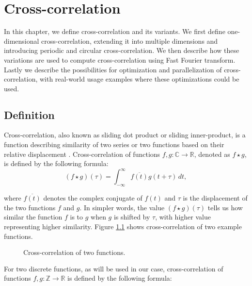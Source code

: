 
\chapter{Cross-correlation}
\label{sec:cross-corr}

In this chapter, we define cross-correlation and its variants. We first define one-dimensional cross-correlation, extending it into multiple dimensions and introducing periodic and circular cross-correlation. We then describe how these variations are used to compute cross-correlation using Fast Fourier transform. Lastly we describe the possibilities for optimization and parallelization of cross-correlation, with real-world usage examples where these optimizations could be used.


\section{Definition}

Cross-correlation, also known as sliding dot product or sliding inner-product, is a function describing similarity of two series or two functions based on their relative displacement \citep{site:wiki_cross_corr}.
Cross-correlation of functions $f,g: \mathbb{C} \rightarrow \mathbb{R}$, denoted as \(f \star g\), is defined by the following formula:
\[
	(f \star g)(\tau) = \int_{-\infty}^{\infty} \overline{f(t)}g(t + \tau) \,dt,
\] 

where \(\overline{f(t)}\) denotes the complex conjugate of \(f(t)\) and \(\tau\) is the displacement of the two functions \(f\) and \(g\). In simpler words, the value \((f \star g)(\tau)\) tells us how similar the function \(f\) is to \(g\) when \(g\) is shifted by \(\tau\), with higher value representing higher similarity. Figure \ref{fig:cross_corr_example} shows cross-correlation of two example functions.

\begin{figure}[h]
	\centering
	\def\svgwidth{0.8\textwidth}
	
	\caption{Cross-correlation of two functions. \cite{pic:crosscorr}}
	\label{fig:cross_corr_example}
\end{figure}

For two discrete functions, as will be used in our case, cross-correlation of functions \( f, g : \mathbb{Z} \rightarrow \mathbb{R} \) is defined by the following formula:

